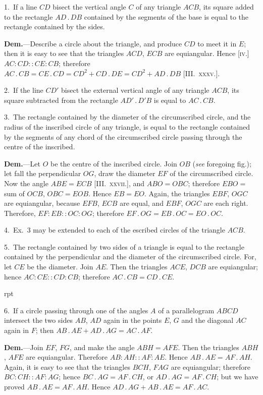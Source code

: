 \documentclass[oneside]{book}
\newcounter{wrapwidth}
\newcommand\imgflow[3]{
\setcounter{wrapwidth}{#1}

\begin{wrapfigure}[#2]{r}{\value{wrapwidth}pt}
\begin{center}
\vspace{-0.3in}

\end{center}
\end{wrapfigure}
}
\newcommand\imgcent[2]{
\begin{center}

\end{center}
}
\begin{document}
\begin{footnotesize}
1.~If a line $CD$ bisect the vertical angle $C$ of any triangle $ACB$,
its square added to the rectangle $AD\,.\,DB$
contained by the segments of the base is
equal to the rectangle contained by the
sides.

\textbf{Dem.}---Describe a circle about the triangle,
and produce $CD$ to meet it in $E$;
then it is easy to see that the triangles
$ACD$, $ECB$ are equiangular. Hence [\textsc{iv.}]
$AC:CD::CE:CB$; therefore $AC\,.\,CB
= CE\,.\,CD = CD^2 + CD\,.\,DE = CD^2 +
AD\,.\,DB$ [III\@.~\textsc{xxxv.}].

2.~If the line $CD'$ bisect the external vertical angle of any triangle
$ACB$, its square subtracted from the rectangle $AD'\,.\,D'B$
is equal to $AC\,.\,CB$.

3.~The rectangle contained by the diameter of the circumscribed
circle, and the radius of the inscribed circle of any triangle,
is equal to the rectangle contained by the segments of any
chord of the circumscribed circle passing through the centre of
the inscribed.

\textbf{Dem.}---Let $O$ be the centre of the inscribed circle. Join $OB$
(\emph{see} foregoing fig.); let fall the perpendicular $OG$, draw the diameter
$EF$ of the circumscribed circle. Now the angle $ABE = ECB$
[III\@.~\textsc{xxvii.}], and $ABO = OBC$; therefore $EBO =$ sum of $OCB$,
$OBC = EOB$. Hence $EB = EO$. Again, the triangles $EBF$, $OGC$
are equiangular, because $EFB$, $ECB$ are equal, and $EBF$, $OGC$
are each right. Therefore, $EF:EB::OC:OG$; therefore
$EF\,.\,OG = EB\,.\,OC = EO\,.\,OC$.

4.~Ex.~3 may be extended to each of the escribed circles of the
triangle $ACB$.


\imgcent{100}{f191}

5.~The rectangle contained by two sides of a triangle is equal
to the rectangle contained by the perpendicular
and the diameter of the circumscribed
circle. For, let $CE$ be the diameter.
Join $AE$. Then the triangles $ACE$, $DCB$
are equiangular; hence $AC:CE::CD:CB$;
therefore $AC\,.\,CB = CD\,.\,CE$.


\imgflow{115}{13}{f192}

6.~If a circle passing through one of
the angles $A$ of a parallelogram $ABCD$
intersect the two sides $AB$, $AD$ again in
the points $E$, $G$ and the diagonal $AC$ again in $F$; then $AB\,.\,AE
+ AD\,.\,AG = AC\,.\,AF$.



\textbf{Dem.}---Join $EF$, $FG$, and make the angle $ABH = AFE$. Then
the triangles $ABH$, $AFE$ are equiangular.
Therefore $AB : AH :: AF : AE$.
Hence $AB\,.\,AE = AF\,.\,AH$. Again, it
is easy to see that the triangles $BCH$,
$FAG$ are equiangular; therefore $BC : CH
:: AF : AG$; hence $BC\,.\,AG = AF\,.\,CH$,
or $AD\,.\,AG = AF\,.\,CH$; but we have
proved $AB\,.\,AE = AF\,.\,AH$. Hence
$AD\,.\,AG + AB\,.\,AE = AF\,.\,AC$.


\end{footnotesize}
\end{document}
